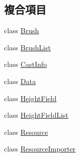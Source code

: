 \subsection*{複合項目}
\begin{DoxyCompactItemize}
\item 
class \hyperlink{class_magnum_1_1_scene_collision_1_1_brush}{Brush}
\item 
class \hyperlink{class_magnum_1_1_scene_collision_1_1_brush_list}{Brush\+List}
\item 
class \hyperlink{class_magnum_1_1_scene_collision_1_1_cast_info}{Cast\+Info}
\item 
class \hyperlink{class_magnum_1_1_scene_collision_1_1_data}{Data}
\item 
class \hyperlink{class_magnum_1_1_scene_collision_1_1_height_field}{Height\+Field}
\item 
class \hyperlink{class_magnum_1_1_scene_collision_1_1_height_field_list}{Height\+Field\+List}
\item 
class \hyperlink{class_magnum_1_1_scene_collision_1_1_resource}{Resource}
\item 
class \hyperlink{class_magnum_1_1_scene_collision_1_1_resource_importer}{Resource\+Importer}
\end{DoxyCompactItemize}

